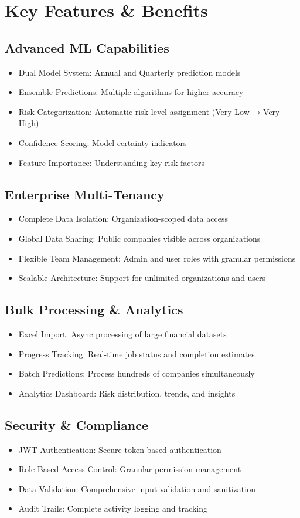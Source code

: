\documentclass[a4paper,12pt]{article}
\newcommand{\sectionbreak}{\clearpage}
\newcommand{\subitem}[1]{\item[\textbullet] #1}
\begin{document}
\sectionbreak

\section*{Key Features \& Benefits}

\subsection*{Advanced ML Capabilities}
\begin{itemize}
    \subitem Dual Model System: Annual and Quarterly prediction models
    \subitem Ensemble Predictions: Multiple algorithms for higher accuracy
    \subitem Risk Categorization: Automatic risk level assignment (Very Low → Very High)
    \subitem Confidence Scoring: Model certainty indicators
    \subitem Feature Importance: Understanding key risk factors
\end{itemize}

\subsection*{Enterprise Multi-Tenancy}
\begin{itemize}
    \subitem Complete Data Isolation: Organization-scoped data access
    \subitem Global Data Sharing: Public companies visible across organizations
    \subitem Flexible Team Management: Admin and user roles with granular permissions
    \subitem Scalable Architecture: Support for unlimited organizations and users
\end{itemize}

\subsection*{Bulk Processing \& Analytics}
\begin{itemize}
    \subitem Excel Import: Async processing of large financial datasets
    \subitem Progress Tracking: Real-time job status and completion estimates
    \subitem Batch Predictions: Process hundreds of companies simultaneously
    \subitem Analytics Dashboard: Risk distribution, trends, and insights
\end{itemize}

\subsection*{Security \& Compliance}
\begin{itemize}
    \subitem JWT Authentication: Secure token-based authentication
    \subitem Role-Based Access Control: Granular permission management
    \subitem Data Validation: Comprehensive input validation and sanitization
    \subitem Audit Trails: Complete activity logging and tracking
\end{itemize}
\end{document}
